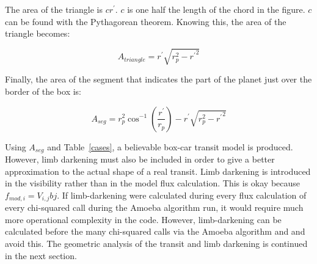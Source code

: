 \documentclass[iop]{emulateapj}
\newcommand{\fmod}{\mbox{$f_{mod,i}$}}
\begin{document}
The area of the triangle is $cr^{\prime}$. $c$ is one half the length of the chord in the figure. $c$ can be found with the Pythagorean theorem. Knowing this, the area of the triangle becomes: 

\begin{equation}
	A_{triangle} = r^{\prime}\sqrt{r_p^2 - {r^{\prime}}^2}
\end{equation}

Finally, the area of the segment that indicates the part of the planet just over the border of the box is:

\begin{equation}
	A_{seg} = r_p^2 \cos^{-1}\left(\frac{r^{\prime}}{r_p}\right) - r^{\prime} \sqrt{r_p^2 - {r^{\prime}}^2}
\end{equation}

Using $A_{seg} $ and Table~\ref{cases}, a believable box-car transit model is produced. However, limb darkening must also be included in order to give a better approximation to the actual shape of a real transit. Limb darkening is introduced in the visibility rather than in the model flux calculation. This is okay because $\fmod = V_{i,j} b{j}$. If limb-darkening were calculated during every flux calculation of every chi-squared call during the Amoeba algorithm run, it would require much more operational complexity in the code. However, limb-darkening can be calculated before the many chi-squared calls via the Amoeba algorithm and and avoid this.  The geometric analysis of the transit and limb darkening is continued in the next section.
\end{document}
